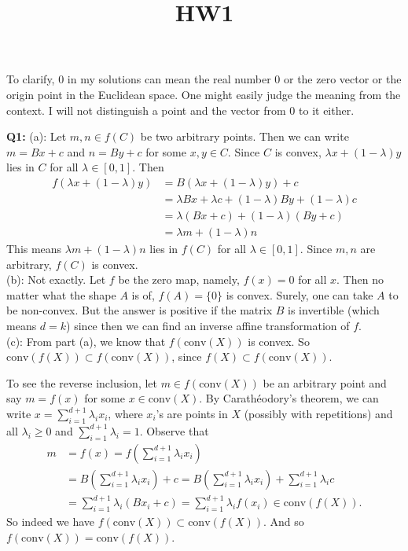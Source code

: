 \documentclass[12pt,reqno]{amsart}
\theoremstyle{definition}
\newcommand{\conv}[1]{\mathrm{conv}(#1)}
\begin{document}
\title{HW1}

\noindent To clarify, 0 in my solutions can mean the real number 0 or the zero vector or the origin point in the Euclidean space. One might easily judge the meaning from the context. I will not distinguish a point and the vector from 0 to it either.

\vspace{0.2in}

\noindent \textbf{Q1:} (a): Let $m,n\in f(C)$ be two arbitrary points. Then we can write $m=Bx+c$ and $n=By+c$ for some $x,y\in C$. Since $C$ is convex, $\lambda x +(1-\lambda) y$ lies in $C$ for all $\lambda\in [0,1]$. Then
\begin{align*}
  f(\lambda x+ (1-\lambda)y) & = B(\lambda x+ (1-\lambda)y)+c                       \\
                             & = \lambda Bx +\lambda c + (1-\lambda)By+(1-\lambda)c \\
                             & = \lambda(Bx+c)+(1-\lambda)(By+c)                    \\
                             & =\lambda m+(1-\lambda)n
\end{align*}
This means $\lambda m+(1-\lambda)n$ lies in $f(C)$ for all $\lambda\in [0,1]$. Since $m,n$ are arbitrary, $f(C)$ is convex.\\

(b): Not exactly. Let $f$ be the zero map, namely, $f(x)=0$ for all $x$. Then no matter what the shape $A$ is of, $f(A)=\{0\}$ is convex. Surely, one can take $A$ to be non-convex. But the answer is positive if the matrix $B$ is invertible (which means $d=k$) since then we can find an inverse affine transformation of $f$.\\

(c): From part (a), we know that $f(\conv{X})$ is convex. So $\conv{f(X)}\subset f(\conv{X})$, since $f(X)\subset f(\conv{X})$.

To see the reverse inclusion, let $m\in f(\conv{X})$ be an arbitrary point and say $m=f(x)$ for some $x\in \conv{X}$. By Carath\'eodory's theorem, we can write $x=\sum_{i=1}^{d+1}\lambda_i x_i$, where $x_i$'s are points in $X$ (possibly with repetitions) and all $\lambda_i\geq 0$ and $\sum_{i=1}^{d+1}\lambda_i=1$. Observe that
\begin{align*}
  m & =  f(x) = f(\sum_{i=1}^{d+1}\lambda_i x_i)                                                           \\
    & = B(\sum_{i=1}^{d+1}\lambda_i x_i)+c = B(\sum_{i=1}^{d+1}\lambda_i x_i) +\sum_{i=1}^{d+1}\lambda_i c \\
    & = \sum_{i=1}^{d+1}\lambda_i (Bx_i+c) = \sum_{i=1}^{d+1}\lambda_i f(x_i)\in \conv{f(X)}.
\end{align*}
So indeed we have $f(\conv{X})\subset \conv{f(X)}$. And so $f(\conv{X}) = \conv{f(X)}$.
\end{document}
